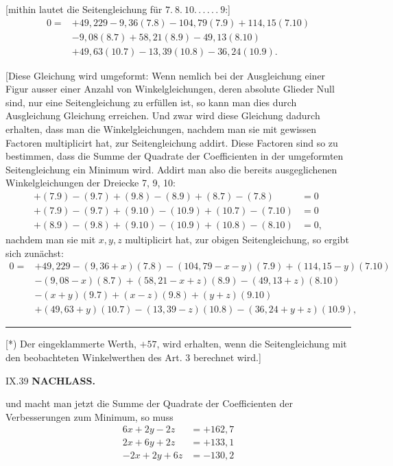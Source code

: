 [mithin lautet die Seitengleichung für $7.\ 8.\ 10.\,.\,.\,.\,.\,.\ 9$:]
\[
\begin{aligned}
0={}&+49{,}229-9{,}36(7.8)-104{,}79(7.9)+114{,}15(7.10)\\
&-9{,}08(8.7)+58{,}21(8.9)-49{,}13(8.10)\\
&+49{,}63(10.7)-13{,}39(10.8)-36{,}24(10.9).
\end{aligned}
\]

[Diese Gleichung wird umgeformt: Wenn nemlich bei der Ausgleichung
einer Figur ausser einer Anzahl von Winkelgleichungen, deren absolute Glieder
Null sind, nur eine Seitengleichung zu erfüllen ist, so kann man dies durch
Ausgleichung  Gleichung erreichen. Und zwar wird diese
Gleichung dadurch erhalten, dass man die Winkelgleichungen, nachdem man
sie mit gewissen Factoren multiplicirt hat, zur Seitengleichung addirt. Diese
Factoren sind so zu bestimmen, dass die Summe der Quadrate der
Coefficienten in der umgeformten Seitengleichung ein Minimum wird. Addirt man
also die bereits ausgeglichenen Winkelgleichungen der Dreiecke 7, 9, 10:
\[
\begin{aligned}
+(7.9)-(9.7)+(9.8)-(8.9)+(8.7)-(7.8)&=0\\
+(7.9)-(9.7)+(9.10)-(10.9)+(10.7)-(7.10)&=0\\
+(8.9)-(9.8)+(9.10)-(10.9)+(10.8)-(8.10)&=0,
\end{aligned}
\]
nachdem man sie mit $x,y,z$ multiplicirt hat, zur obigen Seitengleichung, so
ergibt sich zunächst:
\[
\begin{aligned}
0={}&+49{,}229-(9{,}36+x)(7.8)-(104{,}79-x-y)(7.9)+(114{,}15-y)(7.10)\\
&-(9{,}08-x)(8.7)+(58{,}21-x+z)(8.9)-(49{,}13+z)(8.10)\\
&-(x+y)(9.7)+(x-z)(9.8)+(y+z)(9.10)\\
&+(49{,}63+y)(10.7)-(13{,}39-z)(10.8)-(36{,}24+y+z)(10.9),
\end{aligned}
\]
\par\smallskip
\noindent\rule{0.25\textwidth}{0.4pt}\par
{\footnotesize
[*) Der eingeklammerte Werth, $+57$, wird erhalten, wenn die Seitengleichung mit den beobachteten
Winkelwerthen des Art. 3 berechnet wird.]\par}
\vfill
\noindent\textsc{IX.}\hfill39
\newpage
{}\hfill\textbf{NACHLASS.}\par\medskip
\noindent und macht man jetzt die Summe der Quadrate der Coefficienten der
Verbesserungen zum Minimum, so muss
\[
\begin{aligned}
6x+2y-2z&=+162{,}7\\
2x+6y+2z&=+133{,}1\\
-2x+2y+6z&=-130{,}2
\end{aligned}
\]
